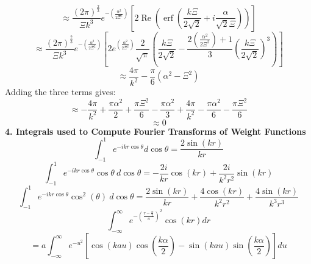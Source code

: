 \documentclass[12pt]{article}
\begin{document}
\begin{displaymath}{\approx\frac{\left(2\pi\right)^\frac{2}{3}}{\Xi{k}^3}e^{-\left(\frac{\alpha^2}{2\Xi^2}\right)}\left[2\operatorname{Re}\left(\operatorname{erf}\left(\frac{k\Xi}{2\sqrt{2}}+i\frac{\alpha}{\sqrt{2}\Xi}\right)\right)\right]}\end{displaymath} 
\begin{displaymath}{\approx\frac{\left(2\pi\right)^\frac{2}{3}}{\Xi{k}^3}e^{-\left(\frac{\alpha^2}{2\Xi^2}\right)}\left[2e^{\left(\frac{\alpha^2}{2\Xi^2}\right)}\frac{2}{\sqrt{\pi}}   \left(\frac{k\Xi}{2\sqrt{2}}   -\frac{2\left(\frac{\alpha^2}{2\Xi^2}\right)+1}{3}\left(\frac{k\Xi}{2\sqrt{2}}\right)^3\right)\right]}\end{displaymath}
\begin{displaymath}{\approx\frac{4\pi}{k^2}-\frac{\pi}{6}\left(\alpha^2-\Xi^2\right)}\end{displaymath}  
\color{black}
Adding the three terms gives:
\begin{displaymath}{\approx-\frac{4\pi}{k^2}+\frac{\pi\alpha^2}{2}+\frac{\pi\Xi^2}{6}-\frac{\pi\alpha^2}{3}+\frac{4\pi}{k^2}-\frac{\pi\alpha^2}{6}-\frac{\pi\Xi^2}{6}}\end{displaymath} 
\begin{displaymath}{\approx0}\end{displaymath} 
\[{}\]
\textbf{4. Integrals used to Compute Fourier Transforms of Weight Functions}
\begin{equation}{\int_{-1}^{1}{e^{-ikr\cos{\theta}}d{\cos{\theta}}}=\frac{2\sin(kr)}{kr}}\end{equation} 
\begin{equation}{\int_{-1}^{1}{e^{-ikr\cos{\theta}}\cos{\theta}{~}d{\cos{\theta}}}=-\frac{2i}{kr}\cos(kr)+\frac{2i}{k^2r^2}\sin(kr)}\end{equation} 
\[{}\]
\begin{equation}{\int_{-1}^{1}{e^{-ikr\cos{\theta}}\cos^2(\theta)~d{\cos{\theta}}}=\frac{2\sin(kr)}{kr}+\frac{4\cos(kr)}{k^2r^2}+\frac{4\sin(kr)}{k^3r^3}}\end{equation} 
\[{}\]
\[{}\]
\begin{equation}{\int_{-\infty}^{\infty}{e^{-\left(\frac{r-\frac{\alpha}{2}}{a}\right)^2}\cos(kr)d{r}}}\end{equation}
\begin{displaymath}{=a\int_{-\infty}^{\infty}{e^{-u^2}\left[\cos(kau)\cos(\frac{k\alpha}{2})-\sin(kau)\sin(\frac{k\alpha}{2})\right]d{u}}}\end{displaymath}  
\end{document}
